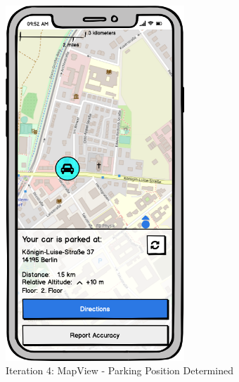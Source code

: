 \begin{figure}[H]
  \centering
  \begin{minipage}[b]{0.45\textwidth}
    \centering
    \includegraphics[width=0.6\textwidth]{images/UI/Iteration4-MapView-ParkingPositionDetermined.png}
    \caption{Iteration 4: MapView - Parking Position Determined}
    \label{fig:i4-mv-parking}
  \end{minipage}
  \hfill
  \begin{minipage}[b]{0.45\textwidth}
    \centering

\end{minipage}
\end{figure}
